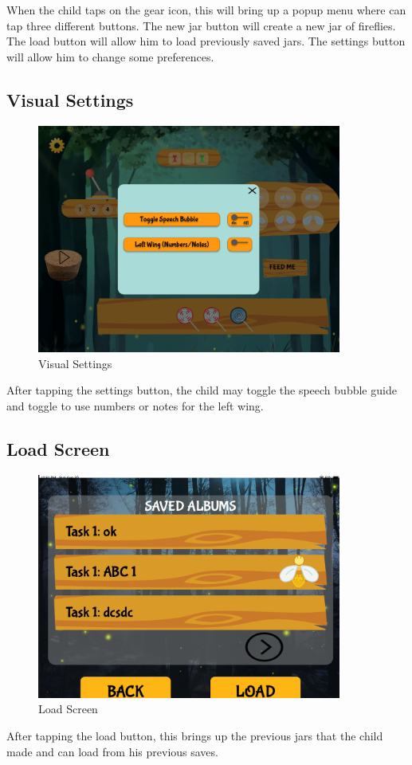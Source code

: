 When the child taps on the gear icon, this will bring up a popup menu where can tap three different buttons. The new jar button will create a new jar of fireflies. The load button will allow him to load previously saved jars. The settings button will allow him to change some preferences.

\subsection{Visual Settings}

\begin{figure}[H]
    \centering
    \includegraphics[width=10cm]{figures/newScreenFlows/newsettings.png}
    \caption{Visual Settings}
    \label{fig:newvisettings}
\end{figure}

After tapping the settings button, the child may toggle the speech bubble guide and toggle to use numbers or notes for the left wing.

\subsection{Load Screen}

\begin{figure}[H]
    \centering
    \includegraphics[width=10cm]{figures/newScreenFlows/newload.png}
    \caption{Load Screen}
    \label{fig:newload}
\end{figure}
After tapping the load button, this brings up the previous jars that the child made and can load from his previous saves.

